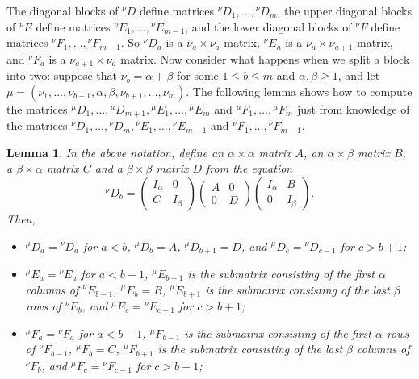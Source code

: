 \documentclass[twoside,12pt,reqno]{amsart}
\newtheorem{Lemma}[Proposition]{Lemma}
\begin{document}
The diagonal blocks of ${^\nu}D$ define matrices
${^\nu}D_1,\dots,{^\nu}D_m$, the upper diagonal blocks of ${^\nu}E$
define matrices ${^\nu}E_1,\dots,{^\nu}E_{m-1}$, and the lower
diagonal blocks of ${^\nu}F$ define matrices ${^\nu}F_1,\dots,{^\nu}F_{m-1}$.
So ${^\nu}D_a$ is a $\nu_a \times \nu_a$ matrix,
${^\nu}E_a$ is a $\nu_a \times \nu_{a+1}$ matrix, and
${^\nu}F_a$ is a $\nu_{a+1}\times \nu_a$ matrix.
Now consider what happens when we split a block into two:
suppose that
$\nu_b = \alpha+\beta$ for some $1 \leq b \leq m$ and 
$\alpha,\beta \geq 1$,
and let $\mu = (\nu_1,\dots,\nu_{b-1},\alpha,\beta,\nu_{b+1},\dots,\nu_m)$.
The following lemma shows how to compute the matrices
${^\mu}D_1,\dots,{^\mu}D_{m+1},
{^\mu}E_1,\dots,{^\mu}E_m$ and ${^\mu}F_1,\dots,{^\mu}F_m$
just from knowledge of the matrices
${^\nu}D_1,\dots,{^\nu}D_{m},
{^\nu}E_1,\dots,{^\nu}E_{m-1}$ and ${^\nu}F_1,\dots,{^\nu}F_{m-1}$.

\begin{Lemma}\label{quasi}
In the above notation, define an $\alpha \times \alpha$ matrix
$A$, an $\alpha\times \beta$ matrix $B$,
a $\beta \times \alpha$ matrix $C$ and a $\beta \times \beta$ matrix $D$
from the equation
$$
{^\nu}D_b = \left(\begin{array}{ll}I_\alpha&0\\
C&I_\beta\end{array}
\right)\left(\begin{array}{ll}A&0\\
0&D\end{array}
\right)\left(\begin{array}{ll}I_\alpha&B\\
0&I_\beta\end{array}
\right).
$$
Then,
\begin{itemize}
\item[(i)] ${^\mu}D_a = {^\nu}D_a$ for $a < b$, ${^\mu}D_b = A$,
${^\mu}D_{b+1} = D$, and ${^\mu}D_c = {^\nu}D_{c-1}$ for $c > b+1$;
\item[(ii)] ${^\mu}E_a = {^\nu}E_a$ for $a < b-1$,
${^\mu}E_{b-1}$ is the submatrix consisting
of the first $\alpha$ columns
of
${^\nu}E_{b-1}$, ${^\mu}E_{b} = B$, ${^\mu}E_{b+1}$ is the submatrix consisting of the last $\beta$ rows  
of ${^\nu}E_b$, and ${^\mu}E_c = {^\nu}E_{c-1}$ for $c > b+1$;
\item[(iii)] ${^\mu}F_a = {^\nu}F_a$ for $a < b-1$,
${^\mu}F_{b-1}$ is the submatrix consisting of the first
$\alpha$ rows  of
${^\nu}F_{b-1}$, ${^\mu}F_{b} = C$, ${^\mu}F_{b+1}$ is the submatrix 
consisting of the last $\beta$ columns of
${^\nu}F_b$, and ${^\mu}F_c = {^\nu}F_{c-1}$ for $c > b+1$;
\end{itemize}
\end{Lemma}
\end{document}
